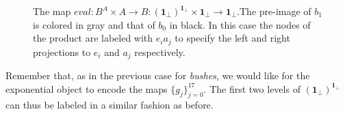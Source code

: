 \begin{figure}[h]
	\caption{The map $eval : B^A \times A \rightarrow B : (\textbf{1}_\bot)^{\textbf{1}_\bot}\times \textbf{1}_\bot \rightarrow \textbf{1}_\bot$.\newline The pre-image of $b_1$ is colored in gray and that of $b_0$ in black. \newline
	In this case the nodes of the product are labeled with $e_ia_j$ to specify the left and right projections to $e_i$ and $a_j$ respectively.}
\end{figure}

\newpage
Remember that, as in the previous case for \emph{bushes}, we would like for the exponential object to encode the maps $\{ g_j \}_{j=0}^{17}$. The first two levels of $(\textbf{1}_\bot)^{\textbf{1}_\bot}$ can thus be labeled in a similar fashion as before. 

